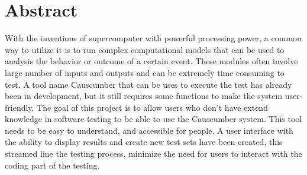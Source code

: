 \chapter*{\Large \center Abstract}

With the inventions of supercomputer with powerful processing power, a common way to utilize it is to run complex computational models that can be used to analysis the behavior or outcome of a certain event. These modules often involve large number of inputs and outputs and can be extremely time consuming to test. A tool name Causcumber that can be uses to execute the test has already been in development, but it still requires some functions to make the system user-friendly. The goal of this project is to allow users who don’t have extend knowledge in software testing to be able to use the Causcumber system. This tool needs to be easy to understand, and accessible for people.
A user interface with the ability to display results and create new
test sets have been created, this streamed line the testing process, minimize the need for users to interact with the coding part of the testing.


